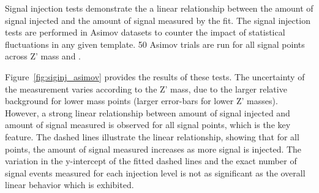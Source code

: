 Signal injection tests demonstrate the a linear relationship between the amount of signal injected and the amount of signal measured by the fit.
The signal injection tests are performed in Asimov datasets to counter the impact of statistical fluctuations in any given template.
50 Asimov trials are run for all signal points across Z' mass and \rinv.


Figure~\ref{fig:siginj_asimov} provides the results of these tests. 
The uncertainty of the measurement varies according to the Z' mass, due to the larger relative background for lower mass points (larger error-bars for lower Z' masses). 
However, a strong linear relationship between amount of signal injected and amount of signal measured is observed for all signal points, which is the key feature.
The dashed lines illustrate the linear relationship, showing that for all points, the amount of signal measured increases as more signal is injected.
The variation in the y-intercept of the fitted dashed lines and the exact number of signal events measured for each injection level is not as significant as the overall linear behavior which is exhibited.
